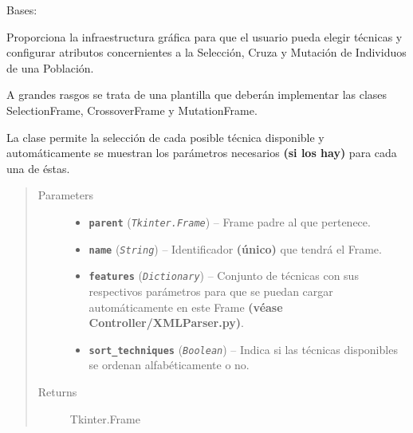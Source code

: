 \documentclass[letterpaper,10pt,english]{sphinxmanual}
\begin{document}
\begin{fulllineitems}
\label{View/Main/GeneticOperator/TemplateGeneticOperator/TemplateGeneticOperatorFrame:View.Main.GeneticOperator.TemplateGeneticOperator.TemplateGeneticOperatorFrame.TemplateGeneticOperatorFrame}
Bases: 

\begin{DUlineblock}{0em}
\item[] Proporciona la infraestructura gráfica para que el usuario pueda 
elegir técnicas y configurar atributos concernientes a la Selección, Cruza y 
Mutación de Individuos de una Población.
\item[] A grandes rasgos se trata de una plantilla que deberán implementar las clases
SelectionFrame, CrossoverFrame y MutationFrame.
\item[] La clase permite la selección de cada posible técnica disponible y automáticamente 
se muestran los parámetros necesarios \textbf{(si los hay)} para cada una de éstas.
\end{DUlineblock}
\begin{quote}\begin{description}
\item[{Parameters}] \leavevmode\begin{itemize}
\item {} 
\textbf{\texttt{parent}} (\emph{\texttt{Tkinter.Frame}}) -- Frame padre al que pertenece.

\item {} 
\textbf{\texttt{name}} (\emph{\texttt{String}}) -- Identificador \textbf{(único)} que tendrá el Frame.

\item {} 
\textbf{\texttt{features}} (\emph{\texttt{Dictionary}}) -- Conjunto de técnicas con sus respectivos parámetros para que
se puedan cargar automáticamente en este Frame \textbf{(véase
Controller/XMLParser.py)}.

\item {} 
\textbf{\texttt{sort\_techniques}} (\emph{\texttt{Boolean}}) -- Indica si las técnicas disponibles se ordenan alfabéticamente
o no.

\end{itemize}

\item[{Returns}] \leavevmode
Tkinter.Frame


\end{description}
\end{quote}
\end{fulllineitems}
\end{document}

